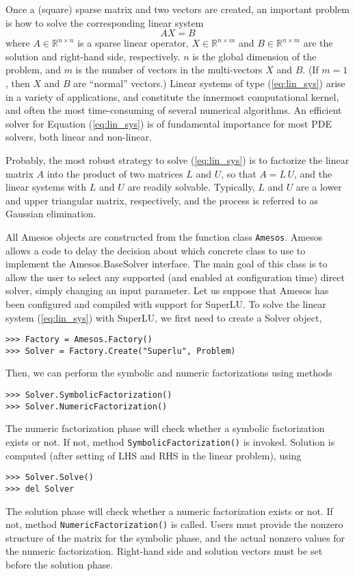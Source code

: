\documentclass[10pt,relax]{SANDreport}
\begin{document}
\smallskip

Once a (square) sparse matrix and two vectors are created, an important
problem is how to solve the corresponding linear system
\begin{equation}
\label{eq:lin_sys}
A X = B
\end{equation}
where $A \in \mathbb{R}^{n \times n}$ is a sparse linear operator, $X \in
\mathbb{R}^{n \times m}$ and $B \in \mathbb{R}^{n \times m}$ are the solution
and right-hand side, respectively. $n$ is the global dimension of the problem,
  and $m$ is the number of vectors in the multi-vectors $X$ and $B$. 
  (If $m = 1$, then $X$ and $B$ are ``normal'' vectors.)
Linear systems of type (\ref{eq:lin_sys}) arise in a variety of applications,
  and constitute the innermost computational kernel, and often the most
  time-consuming of several numerical algorithms. An efficient solver for
  Equation (\ref{eq:lin_sys}) is of fundamental importance for most PDE
  solvers, both linear and non-linear.

\smallskip

Probably, the most robust strategy to solve (\ref{eq:lin_sys}) is to factorize
the linear matrix $A$ into the product of two matrices $L$ and $U$, so that
$A = L \, U$, and 
the linear systems with $L$ and $U$ are readily solvable. Typically,
$L$ and $U$ are a lower and upper triangular matrix, respectively, and the
process is referred to as Gaussian elimination. 

All Amesos objects are constructed from the function class
\verb!Amesos!.  Amesos allows a code to delay the
decision about which concrete class to use to implement the
Amesos.BaseSolver interface. The main goal of this class is to allow
the user to select any supported (and enabled at configuration time)
direct solver, simply changing an input parameter. Let us suppose that Amesos
has been configured and compiled with support for SuperLU. To solve the linear
system (\ref{eq:lin_sys}) with SuperLU, we first need to create a Solver
object,
\begin{verbatim}
>>> Factory = Amesos.Factory()
>>> Solver = Factory.Create("Superlu", Problem)
\end{verbatim}
Then, we can perform the symbolic and numeric factorizations using methods
\begin{verbatim}
>>> Solver.SymbolicFactorization()
>>> Solver.NumericFactorization()
\end{verbatim}
The numeric factorization phase will check whether a symbolic
factorization exists or not. If not, method
\verb!SymbolicFactorization()! is invoked.  Solution is computed (after
setting of LHS and RHS in the linear problem), using
\begin{verbatim}
>>> Solver.Solve()
>>> del Solver
\end{verbatim}
The solution phase will check whether a numeric factorization exists or
not. If not, method \verb!NumericFactorization()! is called.
Users must provide the nonzero structure of the matrix for the symbolic
phase, and the actual nonzero values for the numeric
factorization. Right-hand side and solution vectors must be set before
the solution phase.
  
\end{document}
